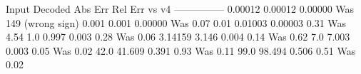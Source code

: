 {}
\markdownRendererSectionEnd \markdownRendererSectionBegin
{}\markdownRendererInterblockSeparator
{}\markdownRendererPipe{} Input \markdownRendererPipe{} Decoded \markdownRendererPipe{} Abs Err \markdownRendererPipe{} Rel Err \markdownRendererPipe{} vs v4 \markdownRendererPipe{}\markdownRendererSoftLineBreak
{}\markdownRendererPipe{}---\markdownRendererPipe{}---\markdownRendererPipe{}---\markdownRendererPipe{}---\markdownRendererPipe{}---\markdownRendererPipe{}\markdownRendererSoftLineBreak
{}\markdownRendererPipe{} 0.00012 \markdownRendererPipe{} 0.00012 \markdownRendererPipe{} 0.00000 \markdownRendererPipe{} \markdownRendererStrongEmphasis{0.23\markdownRendererPercentSign{}} \markdownRendererPipe{} Was 149\markdownRendererPercentSign{} (wrong sign) \markdownRendererPipe{}\markdownRendererSoftLineBreak
{}\markdownRendererPipe{} 0.001 \markdownRendererPipe{} 0.001 \markdownRendererPipe{} 0.00000 \markdownRendererPipe{} \markdownRendererStrongEmphasis{0.00\markdownRendererPercentSign{}} \markdownRendererPipe{} Was 0.07\markdownRendererPercentSign{} \markdownRendererPipe{}\markdownRendererSoftLineBreak
{}\markdownRendererPipe{} 0.01 \markdownRendererPipe{} 0.01003 \markdownRendererPipe{} 0.00003 \markdownRendererPipe{} 0.31\markdownRendererPercentSign{} \markdownRendererPipe{} Was 4.54\markdownRendererPercentSign{} \markdownRendererPipe{}\markdownRendererSoftLineBreak
{}\markdownRendererPipe{} 1.0 \markdownRendererPipe{} 0.997 \markdownRendererPipe{} 0.003 \markdownRendererPipe{} 0.28\markdownRendererPercentSign{} \markdownRendererPipe{} Was 0.06\markdownRendererPercentSign{} \markdownRendererPipe{}\markdownRendererSoftLineBreak
{}\markdownRendererPipe{} 3.14159 \markdownRendererPipe{} 3.146 \markdownRendererPipe{} 0.004 \markdownRendererPipe{} 0.14\markdownRendererPercentSign{} \markdownRendererPipe{} Was 0.62\markdownRendererPercentSign{} \markdownRendererPipe{}\markdownRendererSoftLineBreak
{}\markdownRendererPipe{} 7.0 \markdownRendererPipe{} 7.003 \markdownRendererPipe{} 0.003 \markdownRendererPipe{} 0.05\markdownRendererPercentSign{} \markdownRendererPipe{} Was 0.02\markdownRendererPercentSign{} \markdownRendererPipe{}\markdownRendererSoftLineBreak
{}\markdownRendererPipe{} 42.0 \markdownRendererPipe{} 41.609 \markdownRendererPipe{} 0.391 \markdownRendererPipe{} 0.93\markdownRendererPercentSign{} \markdownRendererPipe{} Was 0.11\markdownRendererPercentSign{} \markdownRendererPipe{}\markdownRendererSoftLineBreak
{}\markdownRendererPipe{} 99.0 \markdownRendererPipe{} 98.494 \markdownRendererPipe{} 0.506 \markdownRendererPipe{} 0.51\markdownRendererPercentSign{} \markdownRendererPipe{} Was 0.02\markdownRendererPercentSign{} \markdownRendererPipe{}\markdownRendererSoftLineBreak
